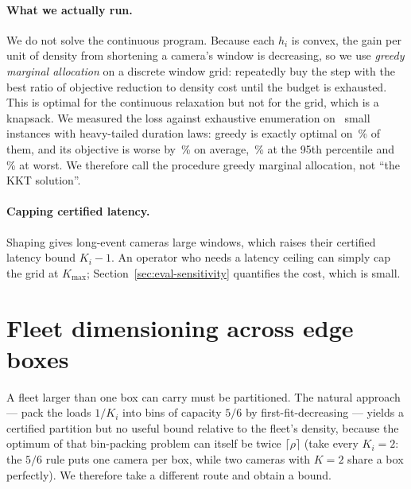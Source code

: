 \documentclass[final,5p,times,twocolumn]{elsarticle}
\theoremstyle{definition}
\newcommand{\Ki}{K_i}
\newcommand{\dens}{\rho}
\begin{document}
\paragraph{What we actually run.} We do not solve the continuous program. Because each $h_i$ is
convex, the gain per unit of density from shortening a camera's window is decreasing, so we use
\emph{greedy marginal allocation} on a discrete window grid: repeatedly buy the step with the best
ratio of objective reduction to density cost until the budget is exhausted. This is optimal for the
continuous relaxation but not for the grid, which is a knapsack. We measured the loss against
exhaustive enumeration on \numCsixTrials\ small instances with heavy-tailed duration laws: greedy
is exactly optimal on \numCsixOptFrac\,\% of them, and its objective is worse by
\numCsixGapMean\,\% on average, \numCsixGapPninefive\,\% at the 95th percentile and
\numCsixGapMax\,\% at worst. We therefore call the procedure greedy marginal allocation, not ``the
KKT solution''.

\paragraph{Capping certified latency.} Shaping gives long-event cameras large windows, which
raises their certified latency bound $\Ki-1$. An operator who needs a latency ceiling can simply
cap the grid at $K_{\max}$; Section~\ref{sec:eval-sensitivity} quantifies the cost, which is small.

\section{Fleet dimensioning across edge boxes}\label{sec:dimensioning}

A fleet larger than one box can carry must be partitioned. The natural approach --- pack the
loads $1/\Ki$ into bins of capacity $5/6$ by first-fit-decreasing --- yields a certified partition
but no useful bound relative to the fleet's density, because the optimum of that bin-packing
problem can itself be twice $\lceil\dens\rceil$ (take every $\Ki=2$: the $5/6$ rule puts one
camera per box, while two cameras with $K=2$ share a box perfectly). We therefore take a different
route and obtain a bound.
\end{document}
